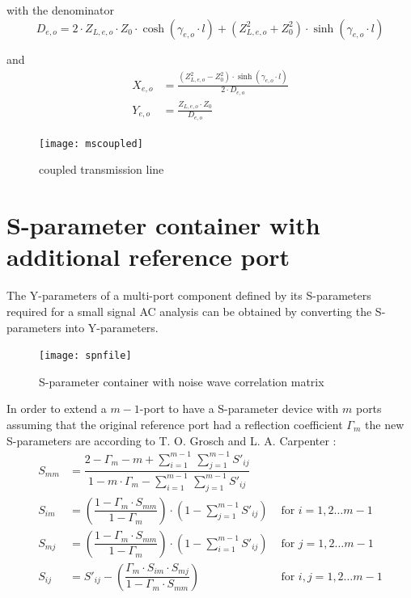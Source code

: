 with the denominator
\begin{equation}
D_{e,o} = 2\cdot Z_{L,e,o}\cdot Z_0\cdot \cosh(\gamma_{e,o}\cdot l)
         + \left(Z_{L,e,o}^2 + Z_0^2\right)\cdot \sinh\left(\gamma_{e,o}\cdot l\right)
\end{equation}

and
\begin{align}
X_{e,o} &= \frac{\left(Z_{L,e,o}^2 - Z_0^2\right)\cdot \sinh\left(\gamma_{e,o}\cdot l\right)}{2\cdot D_{e,o}}\\
Y_{e,o} &= \frac{Z_{L,e,o}\cdot Z_0}{D_{e,o}}
\end{align}

\begin{figure}[ht]
\begin{center}
\texttt{[image: mscoupled]}
\end{center}
\caption{coupled transmission line}
\label{fig:mscoupled}
\end{figure}
\FloatBarrier


\section{S-parameter container with additional reference port}
\label{sec:spfile}

The Y-parameters of a multi-port component defined by its S-parameters
required for a small signal AC analysis can be obtained by converting
the S-parameters into Y-parameters.

\begin{figure}[ht]
\begin{center}
\texttt{[image: spnfile]}
\end{center}
\caption{S-parameter container with noise wave correlation matrix}
\label{fig:spnfile}
\end{figure}
\FloatBarrier

In order to extend a $m - 1$-port to have a S-parameter device with
$m$ ports assuming that the original reference port had a reflection
coefficient $\Gamma_m$ the new S-parameters are according to
T. O. Grosch and L. A. Carpenter \cite{Grosch}:
\begin{align}
S_{mm} &= \dfrac{2 - \Gamma_m - m + {\displaystyle\sum_{i=1}^{m-1}}\, {\displaystyle\sum_{j=1}^{m-1}} S'_{ij}}{1 - m\cdot \Gamma_m - {\displaystyle\sum_{i=1}^{m-1}}\, {\displaystyle\sum_{j=1}^{m-1}} S'_{ij}}\\
S_{im} &= \left(\dfrac{1 - \Gamma_m\cdot S_{mm}}{1 - \Gamma_m}\right)\cdot \left(1 - \sum_{j=1}^{m-1} S'_{ij}\right) &
\textrm{ for } i = 1,2 \ldots m - 1\\
S_{mj} &= \left(\dfrac{1 - \Gamma_m\cdot S_{mm}}{1 - \Gamma_m}\right)\cdot \left(1 - \sum_{i=1}^{m-1} S'_{ij}\right) &
\textrm{ for } j = 1,2 \ldots m - 1\\
S_{ij} &= S'_{ij} - \left(\dfrac{\Gamma_m\cdot S_{im}\cdot S_{mj}}{1 - \Gamma_m\cdot S_{mm}}\right) &
\textrm{ for } i,j = 1,2 \ldots m - 1
\end{align}

